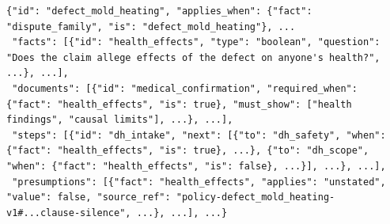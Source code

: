 \begin{lstlisting}[float=t,caption={The tenancy defect workflow (\texttt{defect\_\allowbreak{}mold\_\allowbreak{}heating.json}), trimmed with ellipses and with keys reordered for reading; nothing is added.},label=lst:workflow]
{"id": "defect_mold_heating", "applies_when": {"fact": "dispute_family", "is": "defect_mold_heating"}, ...
 "facts": [{"id": "health_effects", "type": "boolean", "question": "Does the claim allege effects of the defect on anyone's health?", ...}, ...],
 "documents": [{"id": "medical_confirmation", "required_when": {"fact": "health_effects", "is": true}, "must_show": ["health findings", "causal limits"], ...}, ...],
 "steps": [{"id": "dh_intake", "next": [{"to": "dh_safety", "when": {"fact": "health_effects", "is": true}, ...}, {"to": "dh_scope", "when": {"fact": "health_effects", "is": false}, ...}], ...}, ...],
 "presumptions": [{"fact": "health_effects", "applies": "unstated", "value": false, "source_ref": "policy-defect_mold_heating-v1#...clause-silence", ...}, ...], ...}
\end{lstlisting}
